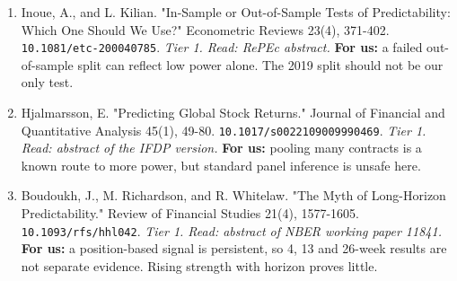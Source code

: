 \begin{enumerate}[leftmargin=*,itemsep=3pt]
\item Inoue, A., and L. Kilian. "In-Sample or Out-of-Sample Tests of Predictability: Which One Should We Use?" Econometric Reviews 23(4), 371-402. \nolinkurl{10.1081/etc-200040785}. \emph{Tier 1. Read: RePEc abstract.} \textbf{For us:} a failed out-of-sample split can reflect low power alone. The 2019 split should not be our only test.
\item Hjalmarsson, E. "Predicting Global Stock Returns." Journal of Financial and Quantitative Analysis 45(1), 49-80. \nolinkurl{10.1017/s0022109009990469}. \emph{Tier 1. Read: abstract of the IFDP version.} \textbf{For us:} pooling many contracts is a known route to more power, but standard panel inference is unsafe here.
\item Boudoukh, J., M. Richardson, and R. Whitelaw. "The Myth of Long-Horizon Predictability." Review of Financial Studies 21(4), 1577-1605. \nolinkurl{10.1093/rfs/hhl042}. \emph{Tier 1. Read: abstract of NBER working paper 11841.} \textbf{For us:} a position-based signal is persistent, so 4, 13 and 26-week results are not separate evidence. Rising strength with horizon proves little.
\end{enumerate}
